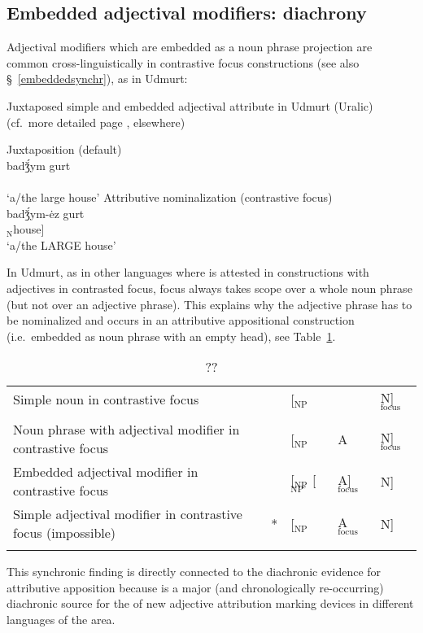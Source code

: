 \subsection{Embedded adjectival modifiers: diachrony}\label{embeddeddiachr}
Adjectival modifiers which are embedded as a noun phrase projection are common cross-linguistically in contrastive focus constructions (see also \S~\ref{embeddedsynchr}), as in Udmurt:
\begin{exe}
\ex \rm{Juxtaposed simple and embedded adjectival attribute in Udmurt (Uralic)}\\(cf.~more detailed page \pageref{udmurt synchr}, elsewhere)
\begin{xlist}
\ex	\rm{Juxtaposition (default)}\\
\gll	{}		badǯ́ym gurt\\
	[$_{\text{NP}}$ $_{\text{A}}$big $_{\text{N}}$house]\\
\glt	‘a/the large house’
\ex	\rm{Attributive nominalization (contrastive focus)}\\
\gll	{}		{}			badǯ́ym-ėz gurt\\
	[$_{\text{NP}}$ [$_{\text{NP'}}$ $_{\text{A}}$big-\textsc{nmlz}] $_{\text{N}}$house]\\
\glt	‘a/the LARGE house’
\end{xlist}
\end{exe}
In Udmurt, as in other languages where  is attested in constructions with adjectives in contrasted focus, focus always takes scope over a whole noun phrase (but not over an adjective phrase). This explains why the adjective phrase has to be nominalized and occurs in an attributive appositional construction (i.e.~embedded as noun phrase with an empty head), see Table~\ref{udm-nom}.
\begin{table}
\begin{tabularx}{\textwidth}{X r l l l}
\lsptoprule
Simple noun in contrastive focus					&	&[$_{\text{NP}}$ 		&			&N]$_{\text{focus}}$\\
\\
\midrule
Noun phrase with adjectival modifier in contrastive focus	&	&[$_{\text{NP}}$ 		&A 			&N]$_{\text{focus}}$\\
\midrule
Embedded adjectival modifier in contrastive focus		&	&[$_{\text{NP}}$ [$_{\text{NP'}}$ &A]$_{\text{focus}}$ 	&N]\\
\midrule
Simple adjectival modifier in contrastive focus (impossible)&{*}	&[$_{\text{NP}}$ 		&A$_{\text{focus}}$ 	&N]\\
\lspbottomrule
\end{tabularx}
\caption[??]{??}\label{udm-nom}
\end{table}
This synchronic finding is directly connected to the diachronic evidence for attributive apposition because  is a major (and chronologically re-occurring) diachronic source for the  of new adjective attribution marking devices in different languages of the area.

